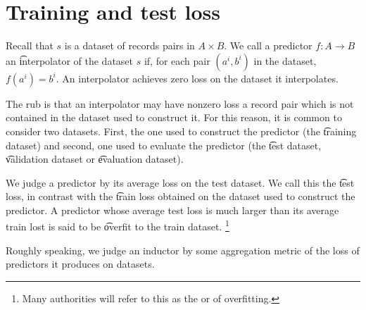 \section*{Training and test loss}

Recall that $s$ is a dataset of records pairs in $A \times B$.
We call a predictor $f: A \to B$ an \t{interpolator} of the dataset $s$ if, for each pair $(a^i, b^i)$ in the dataset, $f(a^i) = b^i$.
An interpolator achieves zero loss on the dataset it interpolates.

The rub is that an interpolator may have nonzero loss a record pair which is not contained in the dataset used to construct it.
For this reason, it is common to consider two datasets.
First, the one used to construct the predictor (the \t{training dataset}) and second, one used to evaluate the predictor (the \t{test dataset}, \t{validation dataset} or \t{evaluation dataset}).

We judge a predictor by its average loss on the test dataset.
We call this the \t{test loss}, in contrast with the \t{train loss} obtained on the dataset used to construct the predictor.
A predictor whose average test loss is much larger than its average train lost is said to be \t{overfit} to the train dataset.
    \ifhmode\unskip\fi\footnote{
Many authorities will refer to this as the  or  of overfitting.
    }

Roughly speaking, we judge an inductor by some aggregation metric of the loss of predictors it produces on datasets.
